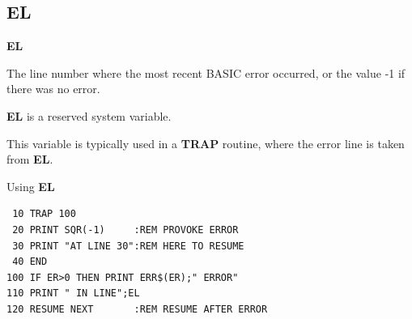 \subsection{EL}
\begin{description}[leftmargin=2cm,style=nextline]
\item [Format:] {\bf EL}
\item [Usage:] The line number where
               the most recent BASIC error occurred,
                or the value -1 if there was no error.
\item [Remarks:] {\bf EL} is a reserved system variable.

This variable is typically used in a {\bf TRAP} routine,
where the error line is taken from {\bf EL}.

\item [Example:] Using {\bf EL}
\begin{tcolorbox}[colback=black,coltext=white]
\verbatimfont{\codefont}
\begin{verbatim}
 10 TRAP 100
 20 PRINT SQR(-1)     :REM PROVOKE ERROR
 30 PRINT "AT LINE 30":REM HERE TO RESUME
 40 END
100 IF ER>0 THEN PRINT ERR$(ER);" ERROR"
110 PRINT " IN LINE";EL
120 RESUME NEXT       :REM RESUME AFTER ERROR
\end{verbatim}
\end{tcolorbox}
\end{description}


\newpage
